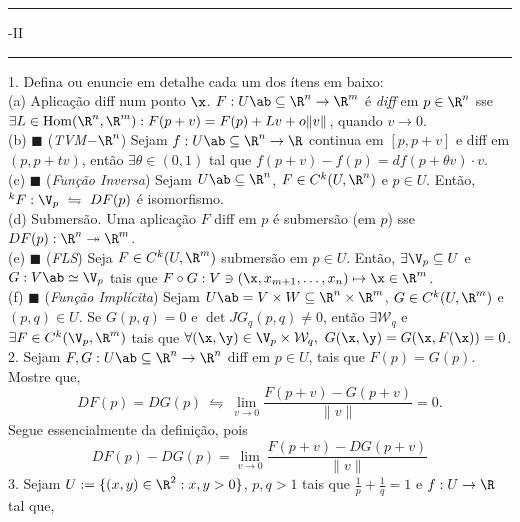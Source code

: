 \newcommand{\F}{\mathbb{F}}
\newcommand{\C}{\mathbb{C}}
\newcommand{\an}{\mathscr{A}} 
\newcommand{\Q}{\mathbb{Q}}
\renewcommand{\hom}{\operatorname{Hom}}
\newcommand{\ehom}{\operatorname{End}}

\-\vspace{-0.3cm}
  {\hrule \vspace{-0.15cm}
  -II \vspace{0.1cm}
  \hrule}

1. Defina ou enuncie em detalhe cada um dos ítens em baixo: \\
(a) Aplicação diff num ponto \(\x\). \textcolor{gris}{\(F: U\ab \subseteq \R^n \to \R^m\) é \emph{diff} em \(p \in \R^n\) sse \(\exists L \in \hom(\R^n, \R^m): F(p+v) = F(p) + Lv + o\|v\|\), quando \(v\to 0\). }\\ 
(b) \(\blacksquare\) (\emph{TVM\(-\R^n\)}) \textcolor{gris}{Sejam \(f: U\ab \subseteq \R^n \to \R\) continua em \([p, p+v]\) e diff em \((p,p+tv)\), então \(\exists \theta \in (0,1)\) tal que \( f(p+v) - f(p) = df(p + \theta v) \cdot v \).   }\\ 
(c) \(\blacksquare\) (\emph{Função Inversa}) \textcolor{gris}{Sejam \(U\ab \subseteq \R^n\), \(F \in C^k(U,\R^n)\) e \(p\in U\). Então, \(^kF: \V_p \ \leftrightharpoons \ DF(p)\) é isomorfismo.  }\\ 
(d) Submersão. \textcolor{gris}{Uma aplicação \(F\) diff em \(p\) é submersão (em \(p\)) sse \(DF(p): \R^n \twoheadrightarrow \R^m\). }\\
(e) \(\blacksquare\) (\emph{FLS}) \textcolor{gris}{Seja \(F\in C^k(U,\R^m)\) submersão em \(p\in U\). Então, \(\exists \V_p \subseteq U\) e \(G:V\ab \simeq \V_p\) tais que \(F\circ G: V \ni (\x, x_{m+1}, \ldots, x_n) \mapsto \x \in \R^m\). }\\
(f) \(\blacksquare\) (\emph{Função Implícita}) \textcolor{gris}{Sejam \(U\ab = V\times W \subseteq \R^n \times \R^m\), \(G \in C^k(U,\R^m)\) e \((p,q) \in U\). Se \(G(p,q)=0\) e \(\det JG_q(p,q) \neq 0\), então \(\exists \mathcal{W}_q\) e \(\exists F \in C^k(\V_p, \R^m)\) tais que \(\forall (\x,\y) \in \V_p\times \mathcal{W}_q, \ G(\x,\y) = G(\x, F(\x)) = 0\). }\\ 
2. Sejam \(F,G: U\ab \subseteq \R^n \to \R^n\) diff em \(p \in U\), tais que \(F(p) = G(p)\). Mostre que,
\[DF(p) = DG(p) \ \leftrightharpoons \ \lim_{v\to 0} \frac{F(p+v) - G(p+v)}{\|v\|} = 0. \]
\textcolor{gris}{
    Segue essencialmente da definição, pois 
    \[DF(p) - DG(p) = \lim_{v\to 0} \frac{F(p+v) -DG(p+v)}{\|v\|}\] 
}
\hspace{-0.1cm}3. Sejam \(U:= \{(x,y) \in \R^2 : x,y >0 \}\), \(p,q >1\) tais que \(\frac{1}{p} + \frac{1}{q} = 1\) e \(f: U \to \R\) tal que, 
